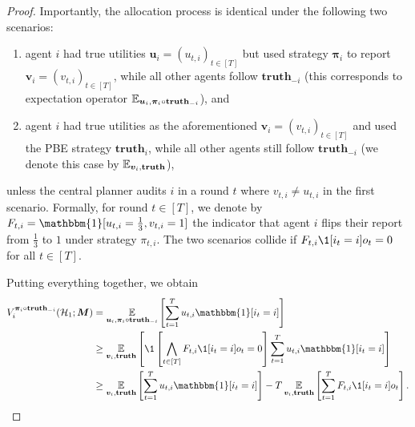 \begin{proof}
    Importantly, the allocation process is identical under the following two scenarios:
    \begin{enumerate}
        \item agent $i$ had true utilities $\bm u_i=(u_{t,i})_{t\in [T]}$ but used strategy $\bm\pi_i$ to report $\bm v_i=(v_{t,i})_{t\in [T]}$, while all other agents follow $\textbf{truth}_{-i}$ (this corresponds to expectation operator $\E_{\bm u_i,\bm \pi_i\circ \textbf{truth}_{-i}}$), and
        \item agent $i$ had true utilities as the aforementioned $\bm v_i=(v_{t,i})_{t\in [T]}$ and used the PBE strategy $\textbf{truth}_i$, while all other agents still follow $\textbf{truth}_{-i}$ (we denote this case by $\E_{\bm v_i,\textbf{truth}}$),
    \end{enumerate}
    unless the central planner audits $i$ in a round $t$ where $v_{t,i}\neq u_{t,i}$ in the first scenario. Formally, for round $t\in[T]$, we denote by $F_{t,i}=\mathbbm{1}[u_{t,i}=\frac 13,v_{t,i}=1]$ the indicator that agent $i$ flips their report from $\frac 13$ to $1$ under strategy $\pi_{t,i}$. The two scenarios collide if $F_{t,i} \1[i_t=i] o_t=0$ for all $t\in[T]$.
    
    Putting everything together, we obtain
    \begin{align}
        V_i^{\bm\pi_i\circ \textbf{truth}_{-i}}(\mH_1;\bm M) &= \E_{\bm u_i,\bm \pi_i\circ \textbf{truth}_{-i}} \sqb{\sum_{t=1}^T u_{t,i} \mathbbm{1}[i_t=i] } \notag \\
        &\geq \E_{\bm v_i,\textbf{truth}} \sqb{ \1\left [\bigwedge_{t\in [T]} F_{t,i}\1[i_t=i]o_t=0\right ]\sum_{t=1}^T u_{t,i} \mathbbm{1}[i_t=i] } \notag  \\
        &\geq \E_{\bm v_i,\textbf{truth}} \sqb{\sum_{t=1}^T u_{t,i} \mathbbm{1}[i_t=i] } - T\E_{\bm v_i,\textbf{truth}}\sqb{\sum_{t=1}^T F_{t,i}\1[i_t=i]o_t}. \label{eq:bound_V_i_deviation_1}
    \end{align}


\end{proof}
